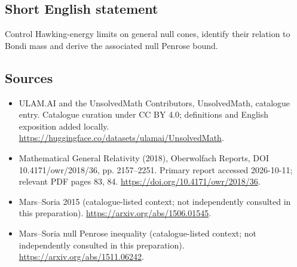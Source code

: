 \documentclass[11pt]{article}
\begin{document}
\subsection{Short English statement}
Control Hawking-energy limits on general null cones, identify their relation to Bondi mass and derive the associated null Penrose bound.
\subsection{Sources}
\begin{itemize}
\item[\hypertarget{source:statement:1}{S1}] ULAM.AI and the UnsolvedMath Contributors, UnsolvedMath, catalogue entry. Catalogue curation under CC BY 4.0; definitions and English exposition added locally.
\url{https://huggingface.co/datasets/ulamai/UnsolvedMath}.
\item[\hypertarget{source:statement:2}{S2}] Mathematical General Relativity (2018), Oberwolfach Reports, DOI 10.4171/owr/2018/36, pp. 2157--2251. Primary report accessed 2026-10-11; relevant PDF pages 83, 84.
\url{https://doi.org/10.4171/owr/2018/36}.
\item[\hypertarget{source:statement:3}{S3}] Mars--Soria 2015 (catalogue-listed context; not independently consulted in this preparation).
\url{https://arxiv.org/abs/1506.01545}.
\item[\hypertarget{source:statement:4}{S4}] Mars--Soria null Penrose inequality (catalogue-listed context; not independently consulted in this preparation).
\url{https://arxiv.org/abs/1511.06242}.
\end{itemize}
\label{end:statement}
\end{document}
